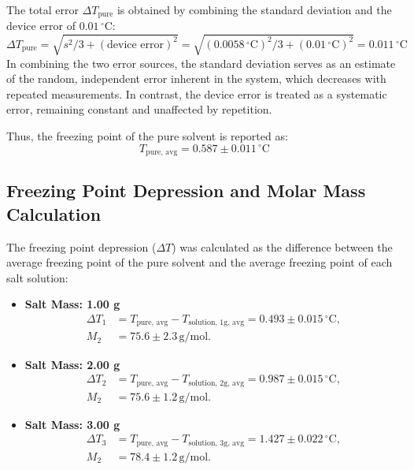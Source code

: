 \documentclass[a4paper,12pt]{article}
\begin{document}
The total error $\Delta T_{\text{pure}}$ is obtained by combining the standard deviation and the device error of $0.01 \, ^\circ\text{C}$:
\[
\Delta T_{\text{pure}} = \sqrt{s^2/3 + (\text{device error})^2} = \sqrt{(0.0058 \, ^\circ\text{C})^2/3 + (0.01 \, ^\circ\text{C})^2} = 0.011 \, ^\circ\text{C}
\]
In combining the two error sources, the standard deviation serves as an estimate of the random, independent error inherent in the system, which decreases with repeated measurements. In contrast, the device error is treated as a systematic error, remaining constant and unaffected by repetition.

Thus, the freezing point of the pure solvent is reported as:
\[
T_{\text{pure, avg}} = 0.587 \pm 0.011 \, ^\circ\text{C}
\]

\subsection{Freezing Point Depression and Molar Mass \\ Calculation}
The freezing point depression ($\Delta T$) was calculated as the difference between the average freezing point of the pure solvent and the average freezing point of each salt solution:

\begin{itemize}
    \item \textbf{Salt Mass: 1.00 g}
    \begin{align*}
    \Delta T_1 &= T_{\text{pure, avg}} - T_{\text{solution, 1g, avg}} = 0.493 \pm 0.015 \, ^\circ\text{C}, \\
    M_2 &= 75.6 \pm 2.3 \, \text{g/mol}.
    \end{align*}

    \item \textbf{Salt Mass: 2.00 g}
    \begin{align*}
    \Delta T_2 &= T_{\text{pure, avg}} - T_{\text{solution, 2g, avg}} = 0.987 \pm 0.015 \, ^\circ\text{C}, \\
    M_2 &= 75.6 \pm 1.2 \, \text{g/mol}.
    \end{align*}

    \item \textbf{Salt Mass: 3.00 g}
    \begin{align*}
    \Delta T_3 &= T_{\text{pure, avg}} - T_{\text{solution, 3g, avg}} = 1.427 \pm 0.022 \, ^\circ\text{C}, \\
    M_2 &= 78.4 \pm 1.2 \, \text{g/mol}.
    \end{align*}
\end{itemize}
\end{document}
